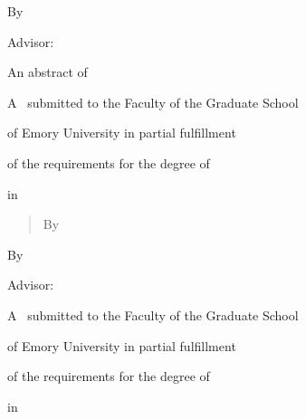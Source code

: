 \documentclass[11pt]{report}
\begin{document}
\begin{titlepage}
\vspace{ 1.5in}
\centerline{\mytitle}
\vspace{ 1in}
\centerline{By}
\vspace{ .25in}
\centerline{\myname}
\centerline{\mydegree}
\vspace{ .75in}
\centerline{Advisor: \myadvisor}

\vspace{1.5in}

\centerline{An abstract of}
\centerline{A \typeofthesis~submitted to the Faculty of the Graduate School}
\centerline{of Emory University in partial fulfillment}
\centerline{of the requirements for the degree of}
\centerline{\thisdegree}
\centerline{in \mydepartment}
\centerline{\thisyear}

\end{titlepage}


\begin{abstract}
\centerline{\mytitle}
\centerline{By \myname}
\vspace{0.25in}
\myabstract
\end{abstract}


\begin{titlepage}

\vspace{ 1.5in}
\centerline{\mytitle}
\vspace{1in}
\centerline{By}
\vspace{ .25in}
\centerline{\myname}
\centerline{
\mydegree
}
\vspace{ .75in}
\centerline{Advisor: \myadvisor}

\vspace{1.75in}

\centerline{A \typeofthesis~submitted to the Faculty of the Graduate School}
\centerline{of Emory University in partial fulfillment}
\centerline{of the requirements for the degree of}
\centerline{\thisdegree}
\centerline{in \mydepartment}
\centerline{\thisyear}
\end{titlepage}




\begin{titlepage}
\centerline{
	\emph{\mydedication}
}
\end{titlepage}
\end{document}
